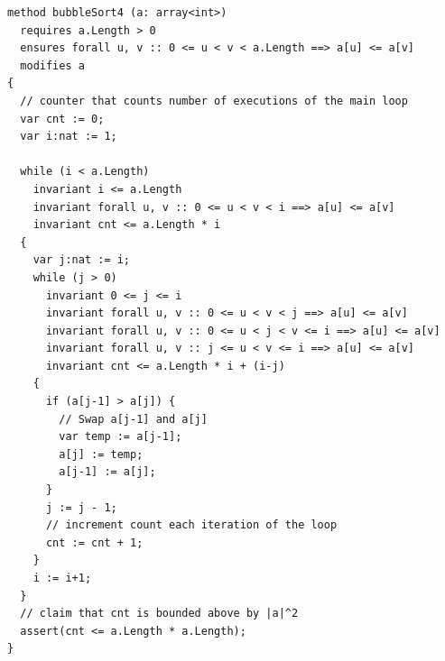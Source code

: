 \documentclass[11pt]{article}
\begin{document}
\begin{lstlisting}[language=dafny]
method bubbleSort4 (a: array<int>)
  requires a.Length > 0
  ensures forall u, v :: 0 <= u < v < a.Length ==> a[u] <= a[v]
  modifies a
{
  // counter that counts number of executions of the main loop
  var cnt := 0;
  var i:nat := 1;

  while (i < a.Length)
    invariant i <= a.Length
    invariant forall u, v :: 0 <= u < v < i ==> a[u] <= a[v]
    invariant cnt <= a.Length * i
  {
    var j:nat := i;
    while (j > 0)
      invariant 0 <= j <= i
      invariant forall u, v :: 0 <= u < v < j ==> a[u] <= a[v]
      invariant forall u, v :: 0 <= u < j < v <= i ==> a[u] <= a[v]
      invariant forall u, v :: j <= u < v <= i ==> a[u] <= a[v]
      invariant cnt <= a.Length * i + (i-j)
    {
      if (a[j-1] > a[j]) {
        // Swap a[j-1] and a[j]
        var temp := a[j-1];
        a[j] := temp;
        a[j-1] := a[j];
      }
      j := j - 1;
      // increment count each iteration of the loop
      cnt := cnt + 1;
    }
    i := i+1;
  }
  // claim that cnt is bounded above by |a|^2
  assert(cnt <= a.Length * a.Length);
}
\end{lstlisting}
\end{document}
